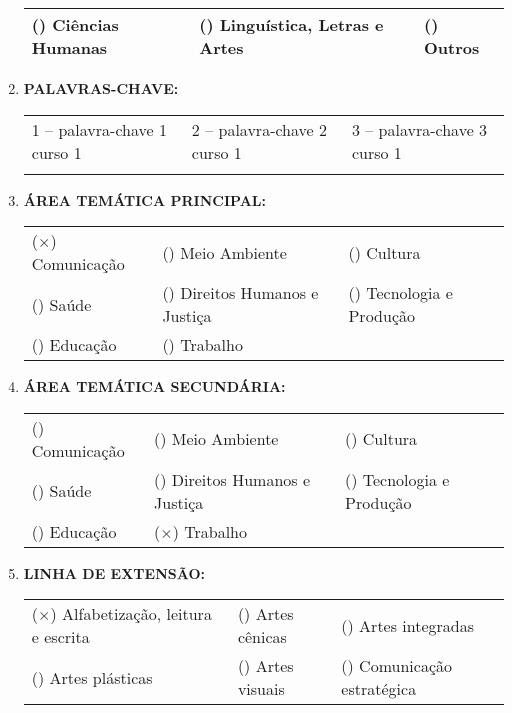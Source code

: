 \documentclass[12pt,a4paper,oneside]{article}%
\begin{document}
\begin{enumerate}
\begin{tabularx}{\linewidth}{|X|X|X|}
(\phantom{$\times$}) Ciências Humanas &(\phantom{$\times$}) Linguística, Letras e Artes &(\phantom{$\times$}) Outros \\%
\hline%
\end{tabularx}%
\item%
\textbf{PALAVRAS{-}CHAVE: }%
\newline%
\begin{tabularx}{\linewidth}{|X|X|X|}%
\hline%
1 -- palavra-chave 1 curso 1&2 -- palavra-chave 2 curso 1&3 -- palavra-chave 3 curso 1\\%
&&\\%
\hline%
\end{tabularx}%
\item%
\textbf{ÁREA TEMÁTICA PRINCIPAL: }%
\newline%
\begin{tabularx}{\linewidth}{|X|X|X|}%
\hline%
($\times$) Comunicação&(\phantom{$\times$}) Meio Ambiente &(\phantom{$\times$}) Cultura \\%
(\phantom{$\times$}) Saúde &(\phantom{$\times$}) Direitos Humanos e Justiça &(\phantom{$\times$}) Tecnologia e Produção \\%
(\phantom{$\times$}) Educação &(\phantom{$\times$}) Trabalho &\\%
\hline%
\end{tabularx}%
\item%
\textbf{ÁREA TEMÁTICA SECUNDÁRIA: }%
\newline%
\begin{tabularx}{\linewidth}{|X|X|X|}%
\hline%
(\phantom{$\times$}) Comunicação &(\phantom{$\times$}) Meio Ambiente &(\phantom{$\times$}) Cultura \\%
(\phantom{$\times$}) Saúde &(\phantom{$\times$}) Direitos Humanos e Justiça &(\phantom{$\times$}) Tecnologia e Produção \\%
(\phantom{$\times$}) Educação &($\times$) Trabalho&\\%
\hline%
\end{tabularx}%
\newpage%
\item%
\textbf{LINHA DE EXTENSÃO: }%
\newline%
\newline%
{\tiny%
\begin{tabularx}{\linewidth}{X|X|X}%
($\times$) Alfabetização, leitura e escrita&(\phantom{$\times$}) Artes cênicas &(\phantom{$\times$}) Artes integradas \\%
(\phantom{$\times$}) Artes plásticas &(\phantom{$\times$}) Artes visuais &(\phantom{$\times$}) Comunicação estratégica \\%

\end{tabularx}}
\end{enumerate}
\end{document}
